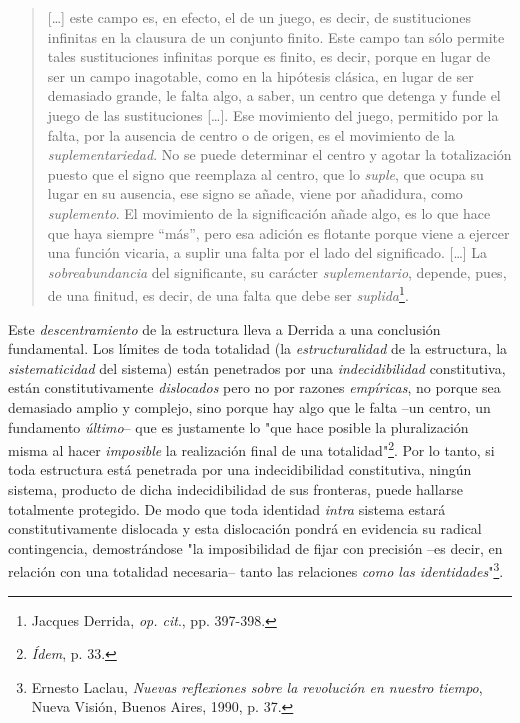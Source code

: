 \documentclass{book}
\begin{document}
\begin{quote}
{[}\ldots{]} este campo es, en efecto, el de un juego, es decir, de
sustituciones infinitas en la clausura de un conjunto finito. Este campo
tan sólo permite tales sustituciones infinitas porque es finito, es
decir, porque en lugar de ser un campo inagotable, como en la hipótesis
clásica, en lugar de ser demasiado grande, le falta algo, a saber, un
centro que detenga y funde el juego de las sustituciones {[}\ldots{]}.
Ese movimiento del juego, permitido por la falta, por la ausencia de
centro o de origen, es el movimiento de la \emph{suplementariedad}. No
se puede determinar el centro y agotar la totalización puesto que el
signo que reemplaza al centro, que lo \emph{suple}, que ocupa su lugar
en su ausencia, ese signo se añade, viene por añadidura, como
\emph{suplemento}. El movimiento de la significación añade algo, es lo
que hace que haya siempre ``más'', pero esa adición es flotante porque
viene a ejercer una función vicaria, a suplir una falta por el lado del
significado. {[}\ldots{]} La \emph{sobreabundancia} del significante, su
carácter \emph{suplementario}, depende, pues, de una finitud, es decir,
de una falta que debe ser \emph{suplida}\footnote{Jacques Derrida,
  \emph{op. cit}., pp. 397-398.}.
\end{quote}

Este \emph{descentramiento} de la estructura lleva a Derrida a una
conclusión fundamental. Los límites de toda totalidad (la
\emph{estructuralidad} de la estructura, la \emph{sistematicidad} del
sistema) están penetrados por una \emph{indecidibilidad} constitutiva,
están constitutivamente \emph{dislocados} pero no por razones
\emph{empíricas}, no porque sea demasiado amplio y complejo, sino porque
hay algo que le falta --un centro, un fundamento \emph{último}-- que es
justamente lo "que hace posible la pluralización misma al hacer
\emph{imposible} la realización final de una totalidad"\footnote{\emph{Ídem},
  p. 33.}. Por lo tanto, si toda estructura está penetrada por una
indecidibilidad constitutiva, ningún sistema, producto de dicha
indecidibilidad de sus fronteras, puede hallarse totalmente protegido.
De modo que toda identidad \emph{intra} sistema estará constitutivamente
dislocada y esta dislocación pondrá en evidencia su radical
contingencia, demostrándose "la imposibilidad de fijar con precisión
--es decir, en relación con una totalidad necesaria-- tanto las
relaciones \emph{como las identidades}"\footnote{Ernesto Laclau,
  \emph{Nuevas reflexiones sobre la revolución en nuestro tiempo}, Nueva
  Visión, Buenos Aires, 1990, p. 37.}.
\end{document}
